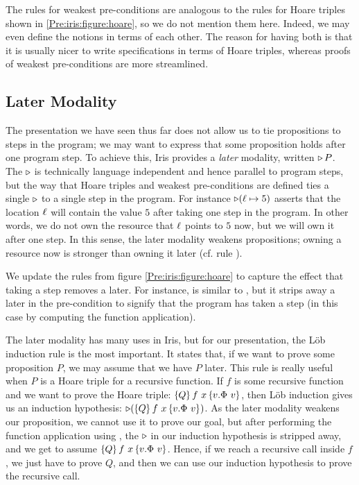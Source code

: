 \documentclass[a4paper, 10pt]{report}
\theoremstyle{definition}
\begin{document}
The rules for weakest pre-conditions are analogous to the rules for Hoare triples shown in \ref{Pre:iris:figure:hoare}, so we do not mention them here. Indeed, we may even define the notions in terms of each other. The reason for having both is that it is usually nicer to write specifications in terms of Hoare triples, whereas proofs of weakest pre-conditions are more streamlined.

\subsection{Later Modality}
\label{Pre:iris:sub:later}

The presentation we have seen thus far does not allow us to tie propositions to steps in the program; we may want to express that some proposition holds after one program step. To achieve this, Iris provides a \textit{later} modality, written $\mathop{\triangleright} P$. The $\mathop{\triangleright}$ is technically language independent and hence parallel to program steps, but the way that Hoare triples and weakest pre-conditions are defined ties a single $\mathop{\triangleright}$ to a single step in the program. For instance $\mathop{\triangleright} (\ell \mapsto 5)$ asserts that the location $\ell$ will contain the value $5$ after taking one step in the program. In other words, we do not own the resource that $\ell$ points to $5$ now, but we will own it after one step. In this sense, the later modality weakens propositions; owning a resource now is stronger than owning it later (cf. rule ).

We update the rules from figure \ref{Pre:iris:figure:hoare} to capture the effect that taking a step removes a later. For instance,  is similar to , but it strips away a later in the pre-condition to signify that the program has taken a step (in this case by computing the function application).

The later modality has many uses in Iris, but for our presentation, the Löb induction rule  is the most important. It states that, if we want to prove some proposition $P$, we may assume that we have $P$ later. This rule is really useful when $P$ is a Hoare triple for a recursive function. If $f$ is some recursive function and we want to prove the Hoare triple: $\hoare{Q}{f ~ x}{v. \Phi ~ v}$, then Löb induction gives us an induction hypothesis: $\later (\hoare{Q}{f ~ x}{v. \Phi ~ v})$. As the later modality weakens our proposition, we cannot use it to prove our goal, but after performing the function application using , the $\mathop{\triangleright}$ in our induction hypothesis is stripped away, and we get to assume $\hoare{Q}{f ~ x}{v. \Phi ~ v}$. Hence, if we reach a recursive call inside $f$, we just have to prove $Q$, and then we can use our induction hypothesis to prove the recursive call.
\end{document}
